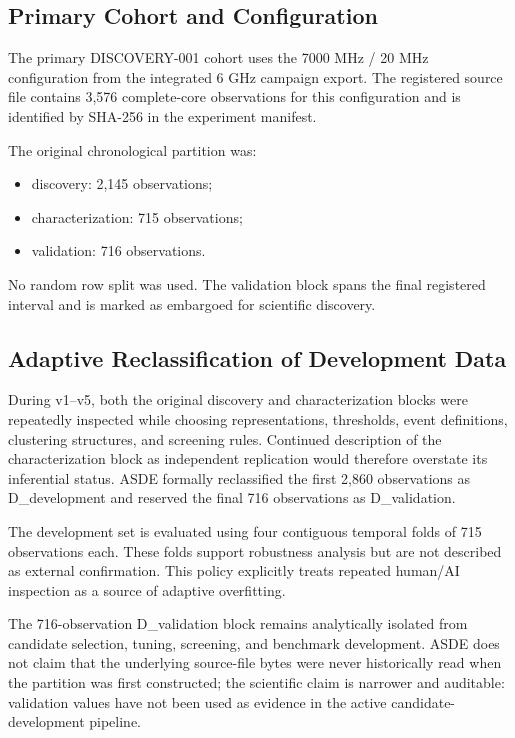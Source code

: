 \documentclass{ieeeaccess}
\providecommand{\tightlist}{\setlength{\itemsep}{0pt}\setlength{\parskip}{0pt}}
\begin{document}
\subsection{Primary Cohort and Configuration}\label{primary-cohort-and-configuration}

The primary DISCOVERY-001 cohort uses the 7000 MHz / 20 MHz configuration from the integrated 6 GHz campaign export. The registered source file contains 3,576 complete-core observations for this configuration and is identified by SHA-256 in the experiment manifest.

The original chronological partition was:

\begin{itemize}
\tightlist
\item
  discovery: 2,145 observations;
\item
  characterization: 715 observations;
\item
  validation: 716 observations.
\end{itemize}

No random row split was used. The validation block spans the final registered interval and is marked as embargoed for scientific discovery.

\subsection{Adaptive Reclassification of Development Data}\label{adaptive-reclassification-of-development-data}

During v1--v5, both the original discovery and characterization blocks were repeatedly inspected while choosing representations, thresholds, event definitions, clustering structures, and screening rules. Continued description of the characterization block as independent replication would therefore overstate its inferential status. ASDE formally reclassified the first 2,860 observations as D\_development and reserved the final 716 observations as D\_validation.

The development set is evaluated using four contiguous temporal folds of 715 observations each. These folds support robustness analysis but are not described as external confirmation. This policy explicitly treats repeated human/AI inspection as a source of adaptive overfitting.

The 716-observation D\_validation block remains analytically isolated from candidate selection, tuning, screening, and benchmark development. ASDE does not claim that the underlying source-file bytes were never historically read when the partition was first constructed; the scientific claim is narrower and auditable: validation values have not been used as evidence in the active candidate-development pipeline.
\end{document}
